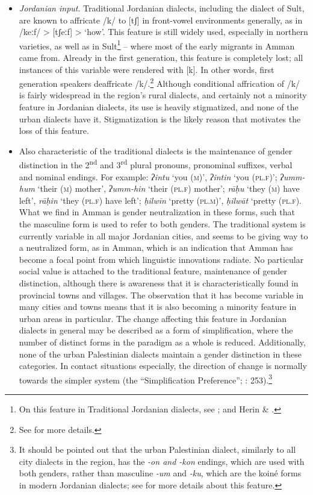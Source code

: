 \documentclass[output=paper]{langsci/langscibook}
\begin{document}
\begin{itemize}
\item \textit{Jordanian input}. Traditional Jordanian dialects, including the dialect of Sult, are known to affricate /k/ to [tʃ] in front-vowel environments generally, as in /keːf/ > [tʃeːf] > ‘how’. This feature is still widely used, especially in northern varieties, as well as in Sult\footnote{On this feature in Traditional Jordanian dialects, see \citet{Al-Hawamdeh2015}; \citet{Herin2010} and Herin \& \citet{Al-Wer2013}.} – where most of the early migrants in Amman came from. Already in the first generation, this feature is completely lost; all instances of this variable were rendered with [k]. In other words, first generation speakers deaffricate /k/.\footnote{See \citet{Al-Wer2007} for more details.} Although conditional affrication of /k/ is fairly widespread in the region’s rural dialects, and certainly not a minority feature in Jordanian dialects, its use is heavily stigmatized, and none of the urban dialects have it. Stigmatization is the likely reason that motivates the loss of this feature.

\item Also characteristic of the traditional dialects is the maintenance of gender distinction in the 2\textsuperscript{nd} and 3\textsuperscript{rd} plural pronouns, pronominal suffixes, verbal and nominal endings. For example: \textit{ʔintu} ‘you (\textsc{m})’, \textit{ʔintin} ‘you (\textsc{pl.f})’; \textit{ʔumm-hum} ‘their (\textsc{m}) mother’, \textit{ʔumm-hin} ‘their (\textsc{pl.f}) mother’; \textit{rāḥu} ‘they (\textsc{m}) have left’, \textit{rāḥin} ‘they (\textsc{pl.f}) have left’; \textit{ḥilwīn} ‘pretty (\textsc{pl.m})’, \textit{ḥilwāt} ‘pretty (\textsc{pl.f}). What we find in Amman is gender neutralization in these forms, such that the masculine form is used to refer to both genders. The traditional system is currently variable in all major Jordanian cities, and seems to be giving way to a neutralized form, as in Amman, which is an indication that Amman has become a focal point from which linguistic innovations radiate. No particular social value is attached to the traditional feature, maintenance of gender distinction, although there is awareness that it is characteristically found in provincial towns and villages. The observation that it has become variable in many cities and towns means that it is also becoming a minority feature in urban areas in particular. The change affecting this feature in Jordanian dialects in general may be described as a form of simplification, where the number of distinct forms in the paradigm as a whole is reduced. Additionally, none of the urban Palestinian dialects maintain a gender distinction in these categories. In contact situations especially, the direction of change is normally towards the simpler system (the “Simplification Preference”; \citealt{Lass1997}: 253).\footnote{It should be pointed out that the urban Palestinian dialect, similarly to all city dialects in the region, has the \textit{{}-on and -kon} endings, which are used with both genders, rather than masculine \textit{{}-um} and \textit{{}-ku}, which are the koiné forms in modern Jordanian dialects; see \citet{Al-Wer2003} for more details about this feature.} 


\end{itemize}
\end{document}
